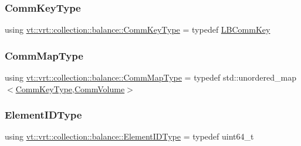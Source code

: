 \mbox{\label{namespacevt_1_1vrt_1_1collection_1_1balance_a01c9a1060d83d052604a3ff12918033a}} 
\subsubsection{\texorpdfstring{Comm\+Key\+Type}{CommKeyType}}
{\footnotesize\ttfamily using \hyperlink{namespacevt_1_1vrt_1_1collection_1_1balance_a01c9a1060d83d052604a3ff12918033a}{vt\+::vrt\+::collection\+::balance\+::\+Comm\+Key\+Type} = typedef \hyperlink{structvt_1_1vrt_1_1collection_1_1balance_1_1_l_b_comm_key}{L\+B\+Comm\+Key}}

\mbox{\label{namespacevt_1_1vrt_1_1collection_1_1balance_a10860c956804d644db54a16012352728}} 
\subsubsection{\texorpdfstring{Comm\+Map\+Type}{CommMapType}}
{\footnotesize\ttfamily using \hyperlink{namespacevt_1_1vrt_1_1collection_1_1balance_a10860c956804d644db54a16012352728}{vt\+::vrt\+::collection\+::balance\+::\+Comm\+Map\+Type} = typedef std\+::unordered\+\_\+map$<$\hyperlink{namespacevt_1_1vrt_1_1collection_1_1balance_a01c9a1060d83d052604a3ff12918033a}{Comm\+Key\+Type},\hyperlink{structvt_1_1vrt_1_1collection_1_1balance_1_1_comm_volume}{Comm\+Volume}$>$}

\mbox{\label{namespacevt_1_1vrt_1_1collection_1_1balance_a14c8d2c972f2913aa3f1636e5be0a120}} 
\subsubsection{\texorpdfstring{Element\+I\+D\+Type}{ElementIDType}}
{\footnotesize\ttfamily using \hyperlink{namespacevt_1_1vrt_1_1collection_1_1balance_a14c8d2c972f2913aa3f1636e5be0a120}{vt\+::vrt\+::collection\+::balance\+::\+Element\+I\+D\+Type} = typedef uint64\+\_\+t}

